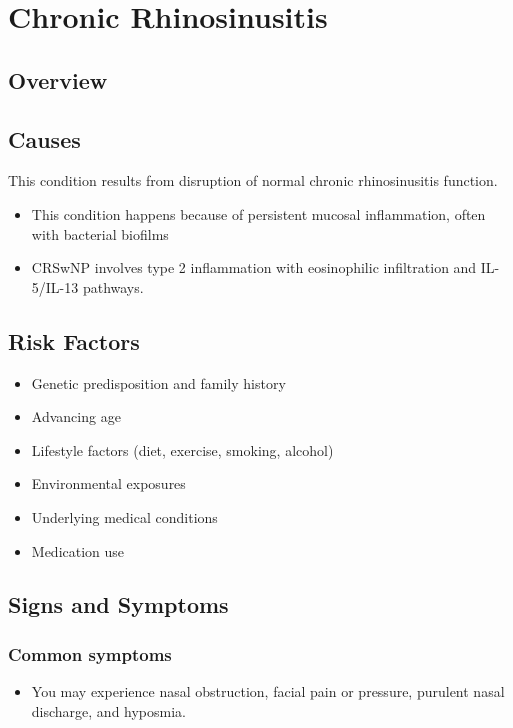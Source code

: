 \chapter{Chronic Rhinosinusitis}
\label{sec:Chronic Rhinosinusitis}

\section{Overview}

\section{Causes}
This condition results from disruption of normal chronic rhinosinusitis function.

\begin{itemize}[noitemsep]
  \item This condition happens because of persistent mucosal inflammation, often with bacterial biofilms
  \item CRSwNP involves type 2 inflammation with eosinophilic infiltration and IL-5/IL-13 pathways.
\end{itemize}
\section{Risk Factors}


\begin{itemize}[noitemsep]
  \item Genetic predisposition and family history
  \item Advancing age
  \item Lifestyle factors (diet, exercise, smoking, alcohol)
  \item Environmental exposures
  \item Underlying medical conditions
  \item Medication use
\end{itemize}
\section{Signs and Symptoms}

\subsection{Common symptoms}
\begin{itemize}[noitemsep]
  \item You may experience nasal obstruction, facial pain or pressure, purulent nasal discharge, and hyposmia. 
  \end{itemize}

